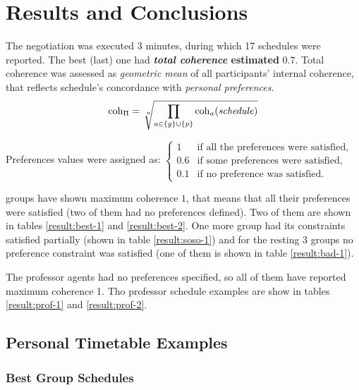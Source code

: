 \documentclass[../header]{subfiles}
\begin{document}
\providecommand{\rootdir}{..}



\section{Results and Conclusions}

The negotiation was executed 3 minutes, during which 17 schedules were reported.
The best (last) one had \textbf{\emph{total coherence} estimated }$\mathbf{0.7}$.
Total coherence was assessed as \emph{geometric mean} of all participants'
internal coherence, that reflects schedule's concordance with \emph{personal preferences}.
$$ \coh_\Pi = \sqrt[\leftroot{-2}\uproot{2}n]
                   {\prod\limits_{a \in \{g\} \cup \{p\}}
                         \coh_a (\mathit{schedule})
                   }
$$

\noindent
Preferences values were assigned as:
$\begin{cases}
  1   & \text{if all the preferences were satisfied,} \\
  0.6 & \text{if some preferences were satisfied,}    \\
  0.1 & \text{if no preference was satisfied.}
\end{cases}$


 groups have shown maximum coherence $1$, that means that all their preferences
were satisfied (two of them had no preferences defined).
Two of them are shown in tables \ref{result:best-1} and \ref{result:best-2}.
One more group had its constraints satisfied partially (shown in table
\ref{result:soso-1}) and for the resting 3 groups no preference constraint was
satisfied (one of them is shown in table \ref{result:bad-1}).

\medskip\noindent
The professor agents had no preferences specified, so all of them have reported
maximum coherence 1. Tho professor schedule examples are show in tables
\ref{result:prof-1} and \ref{result:prof-2}.


\subsection{Personal Timetable Examples}

\subsubsection{Best Group Schedules}
\end{document}
